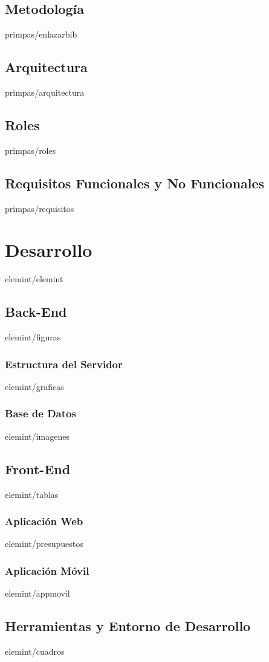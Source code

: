 \documentclass[epsbased,copyright,final,printable,covers,extendedindex,firstnumbered,tfg,gnuplot]{tfgtfmthesisuam}
\begin{document}
  \section{Metodología\label{SEC:ENLAZBIBLIOGRAFIA}}{primpas/enlazarbib}
  \section{Arquitectura\label{SEC:ARQUITECTURA}}{primpas/arquitectura}
  \section{Roles\label{SEC:ROLES}}{primpas/roles}
  \section{Requisitos Funcionales y No Funcionales\label{SEC:REQUISITOS}}{primpas/requisitos}

\chapter{Desarrollo\label{CAP:ELEMINT}}{elemint/elemint}
  \section{Back-End\label{SEC:FIGURAS}}{elemint/figuras}
    \subsection{Estructura del Servidor\label{SS:GRAFICAS}}{elemint/graficas}
    \subsection{Base de Datos\label{SS:INMAGENES}}{elemint/imagenes}
  \section{Front-End\label{SEC:TABLAS}}{elemint/tablas}
    \subsection{Aplicación Web\label{SS:PRESUPUESTOS}}{elemint/presupuestos}
    \subsection{Aplicación Móvil\label{SS:APPMOVIL}}{elemint/appmovil}
  \section{Herramientas y Entorno de Desarrollo\label{SEC:CUADROS}}{elemint/cuadros}
\end{document}

